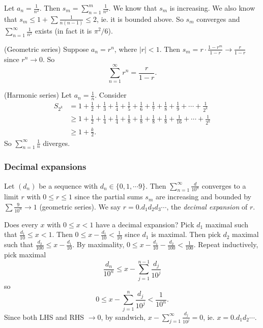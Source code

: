 \documentclass[a4paper]{article}
\begin{document}
\begin{eg}
  Let $a_n = \frac{1}{n^2}$. Then $s_m = \sum_{n = 1}^{m} \frac{1}{n^2}$. We know that $s_m$ is increasing. We also know that $s_m \leq 1 + \sum \frac{1}{n(n -1)} \leq 2$, ie. it is bounded above. So $s_m$ converges and $\sum_{n = 1}^{\infty} \frac{1}{n^2}$ exists (in fact it is $\pi^2/6$).
\end{eg}

\begin{eg}
  (Geometric series) Suppose $a_n = r^n$, where $|r| < 1$. Then $s_m = r\cdot \frac{1 - r^m}{1 - r} \to \frac{r}{1- r}$ since $r^n \to 0$. So
  \[
    \sum_{n = 1}^\infty r^n = \frac{r}{1 - r}.
  \]
\end{eg}

\begin{eg}
  (Harmonic series) Let $a_n = \frac{1}{n}$. Consider
  \begin{align*}
    S_{2^k} &= 1 + \frac{1}{2} + \frac{1}{3} + \frac{1}{4} + \frac{1}{5} + \frac{1}{6} + \frac{1}{7} + \frac{1}{8} + \frac{1}{9} + \cdots + \frac{1}{2^k}\\
    & \geq 1 + \frac{1}{2} + \frac{1}{4} + \frac{1}{4} + \frac{1}{8} + \frac{1}{8} + \frac{1}{8} + \frac{1}{8} + \frac{1}{16} + \cdots + \frac{1}{2^k}\\
    &\geq 1 + \frac{k}{2}.
  \end{align*}
  So $\displaystyle \sum_{n = 1}^\infty\frac{1}{n}$ diverges.
\end{eg}

\subsubsection*{Decimal expansions}
\begin{defi}
  Let $(d_n)$ be a sequence with $d_n\in \{0, 1, \cdots 9\}$. Then $\displaystyle \sum_{n = 1}^\infty \frac{d}{10^n}$ converges to a limit $r$ with $0 \leq r \leq 1$ since the partial sums $s_m$ are increasing and bounded by $\sum \frac{9}{10^n}\to 1$ (geometric series). We say $r = 0.d_1d_2d_3\cdots$, the \emph{decimal expansion} of $r$.
\end{defi}

Does every $x$ with $0 \leq x < 1$ have a decimal expansion?
Pick $d_1$ maximal such that $\frac{d_1}{10} \leq x < 1$. Then $0 \leq x - \frac{d_1}{10} < \frac{1}{10}$ since $d_1$ is maximal. Then pick $d_2$ maximal such that $\frac{d_2}{100} \leq x - \frac{d_1}{10}$. By maximality, $0 \leq x - \frac{d_1}{10} - \frac{d_2}{100}  < \frac{1}{100}$. Repeat inductively, pick maximal
\[
  \frac{d_n}{10^n} \leq x- \sum_{j = 1}^{n - 1} \frac{d_j}{10^j}
\]
so
\[
  0 \leq x - \sum_{j = 1}^n \frac{d_j}{10^j} < \frac{1}{10^n}.
\]
Since both LHS and RHS $\to 0$, by sandwich, $x - \sum_{j = 1}^\infty \frac{d_j}{10^j} = 0$, ie. $x = 0.d_1d_2\cdots$.
\end{document}
